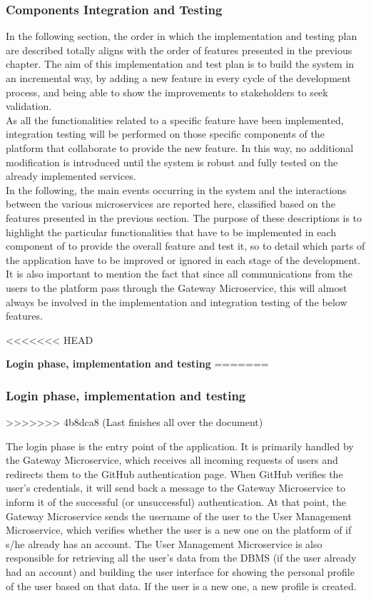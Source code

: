 \subsubsection{Components Integration and Testing}


In the following section, the order in which the implementation and testing plan are described totally aligns with the order of features presented in the previous chapter.
The aim of this implementation and test plan is to build the \app system in an incremental way, by adding a new feature in every cycle of the development process, and being able to show the improvements to stakeholders to seek validation.\\
As all the functionalities related to a specific feature have been implemented, integration testing will be performed on those specific components of the \app platform that collaborate to provide the new feature. In this way, no additional modification is introduced until the system is robust and fully tested on the already implemented services.\\
In the following, the main events occurring in the system and the interactions between the various microservices are reported here, classified based on the features presented in the previous section. The purpose of these descriptions is to highlight the particular functionalities that have to be implemented in each component of \app to provide the overall feature and test it, so to detail which parts of the application have to be improved or ignored in each stage of the development.\\
It is also important to mention the fact that since all communications from the users to the \app platform pass through the Gateway Microservice, this will almost always be involved in the implementation and integration testing of the below features.

<<<<<<< HEAD
\vspace{0.7cm}

\textbf{Login phase, implementation and testing}
=======
\subsubsection*{Login phase, implementation and testing}
>>>>>>> 4b8dca8 (Last finishes all over the document)

The login phase is the entry point of the application. It is primarily handled by the Gateway Microservice, which receives all incoming requests of users and redirects them to the GitHub authentication page. When GitHub verifies the user's credentials, it will send back a message to the Gateway Microservice to inform it of the successful (or unsuccessful) authentication. At that point, the Gateway Microservice sends the username of the user to the User Management Microservice, which verifies whether the user is a new one on the platform of if s/he already has an account. 
The User Management Microservice is also responsible for retrieving all the user's data from the DBMS (if the user already had an account) and building the user interface for showing the personal profile of the user based on that data. If the user is a new one, a new profile is created.

